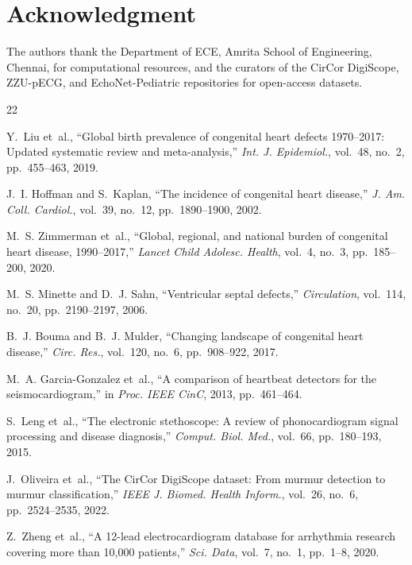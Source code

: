 \documentclass[conference]{IEEEtran}
\begin{document}
\section*{Acknowledgment}
The authors thank the Department of ECE, Amrita School of Engineering, Chennai, for computational resources, and the curators of the CirCor DigiScope, ZZU-pECG, and EchoNet-Pediatric repositories for open-access datasets.

\begin{thebibliography}{22}

Y.~Liu et~al., ``Global birth prevalence of congenital heart defects 1970--2017: Updated systematic review and meta-analysis,'' \textit{Int. J. Epidemiol.}, vol.~48, no.~2, pp.~455--463, 2019.

J.~I. Hoffman and S.~Kaplan, ``The incidence of congenital heart disease,'' \textit{J. Am. Coll. Cardiol.}, vol.~39, no.~12, pp.~1890--1900, 2002.

M.~S. Zimmerman et~al., ``Global, regional, and national burden of congenital heart disease, 1990--2017,'' \textit{Lancet Child Adolesc. Health}, vol.~4, no.~3, pp.~185--200, 2020.

M.~S. Minette and D.~J. Sahn, ``Ventricular septal defects,'' \textit{Circulation}, vol.~114, no.~20, pp.~2190--2197, 2006.

B.~J. Bouma and B.~J. Mulder, ``Changing landscape of congenital heart disease,'' \textit{Circ. Res.}, vol.~120, no.~6, pp.~908--922, 2017.

M.~A. Garcia-Gonzalez et~al., ``A comparison of heartbeat detectors for the seismocardiogram,'' in \textit{Proc. IEEE CinC}, 2013, pp.~461--464.

S.~Leng et~al., ``The electronic stethoscope: A review of phonocardiogram signal processing and disease diagnosis,'' \textit{Comput. Biol. Med.}, vol.~66, pp.~180--193, 2015.

J.~Oliveira et~al., ``The CirCor DigiScope dataset: From murmur detection to murmur classification,'' \textit{IEEE J. Biomed. Health Inform.}, vol.~26, no.~6, pp.~2524--2535, 2022.

Z.~Zheng et~al., ``A 12-lead electrocardiogram database for arrhythmia research covering more than 10,000 patients,'' \textit{Sci. Data}, vol.~7, no.~1, pp.~1--8, 2020.


\end{thebibliography}
\end{document}
